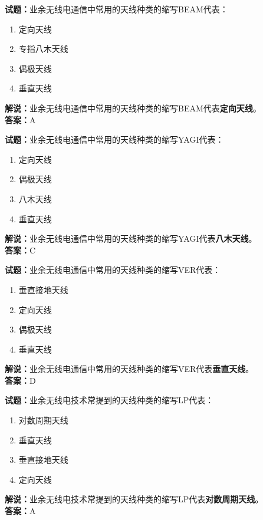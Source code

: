 \documentclass{ctexbook}
\begin{document}
\bigskip


\noindent\textbf{试题：}业余无线电通信中常用的天线种类的缩写BEAM代表：
\begin{enumerate}[leftmargin=3em]
\item 定向天线
\item 专指八木天线
\item 偶极天线
\item 垂直天线
\end{enumerate}
\noindent\textbf{解说：}业余无线电通信中常用的天线种类的缩写BEAM代表\textbf{定向天线}。\\\noindent\textbf{答案：}A


\bigskip


\noindent\textbf{试题：}业余无线电通信中常用的天线种类的缩写YAGI代表：
\begin{enumerate}[leftmargin=3em]
\item 定向天线
\item 偶极天线
\item 八木天线
\item 垂直天线
\end{enumerate}
\noindent\textbf{解说：}业余无线电通信中常用的天线种类的缩写YAGI代表\textbf{八木天线}。\\\noindent\textbf{答案：}C



\bigskip


\noindent\textbf{试题：}业余无线电通信中常用的天线种类的缩写VER代表：
\begin{enumerate}[leftmargin=3em]
\item 垂直接地天线
\item 定向天线
\item 偶极天线
\item 垂直天线
\end{enumerate}
\noindent\textbf{解说：}业余无线电通信中常用的天线种类的缩写VER代表\textbf{垂直天线}。\\\noindent\textbf{答案：}D



\bigskip


\noindent\textbf{试题：}业余无线电技术常提到的天线种类的缩写LP代表：
\begin{enumerate}[leftmargin=3em]
\item 对数周期天线
\item 垂直天线
\item 垂直接地天线
\item 定向天线
\end{enumerate}
\noindent\textbf{解说：}业余无线电技术常提到的天线种类的缩写LP代表\textbf{对数周期天线}。\\\noindent\textbf{答案：}A
\end{document}

